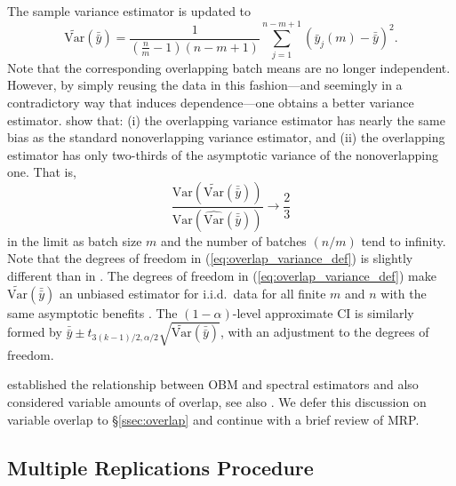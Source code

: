 \documentclass[12pt]{article}
\newcommand{\e}[1]{\mathbb{E} \left[ #1 \right]
}
\newcommand{\var}[1]{\mathrm{Var} \left( #1 \right)}
\newcommand{\vart}[1]{\widetilde{\mathrm{Var}} \left( #1 \right)}
\newcommand{\varhat}{\widehat{\mathrm{Var}}}
\newcommand{\X}{X}
\newcommand{\x}{\mathbf{x}}
\newcommand{\xh}{{\hat{\x}}}
\newcommand{\xit}{\boldsymbol{\xi}}
\newcommand{\zs}{z^*}
\newcommand{\yb}{\bar{y}}
\newcommand{\ybb}{\bar{\yb}}
\begin{document}
The sample variance estimator is updated to
\begin{equation} \label{eq:overlap_variance_def}
	\vart{\ybb} = \frac{1}{(\tfrac{n}{m}-1)(n - m + 1)}\sum_{j=1}^{n-m+1} (\yb_j(m) - \ybb)^2.
\end{equation}
Note that the corresponding overlapping batch means are no longer independent. 
However, by simply reusing the data in this fashion---and seemingly in a contradictory way that induces dependence---one obtains a better variance estimator. 
\citet{Meketon1984} show that: (i) the overlapping variance estimator has nearly the same bias as the standard nonoverlapping variance estimator, and (ii) the overlapping estimator has only two-thirds of the asymptotic variance of the nonoverlapping one.  
That is, 
\begin{equation} \label{eq:asym_var}
	\frac{ \var{\vart{\ybb}} }{ \var{\varhat(\ybb)} } \rightarrow \frac{2}{3}
\end{equation}
in the limit as batch size $m$ and the number of batches $(n/m)$ tend to infinity.  
Note that the degrees of freedom in (\ref{eq:overlap_variance_def}) is slightly different than in \citep{Meketon1984}.  
The degrees of freedom in (\ref{eq:overlap_variance_def}) make $\vart{\ybb}$ an unbiased estimator for i.i.d.\ data for all finite $m$ and $n$ with the same asymptotic benefits \citep{Song1992}.  
The $(1-\alpha)$-level approximate CI is similarly formed by $\ybb \pm t_{3(k-1)/2,\alpha/2} \sqrt{\vart{\ybb}}$, with an adjustment to the degrees of freedom.

\citet{Welch1987} established the relationship between OBM and spectral estimators and also considered variable amounts of overlap, see also \citep{Song1992}.  
We defer this discussion on variable overlap to \S \ref{ssec:overlap} and continue with a brief review of MRP.

\subsection{Multiple Replications Procedure} 
\label{ssec:mrp}

\end{document}
